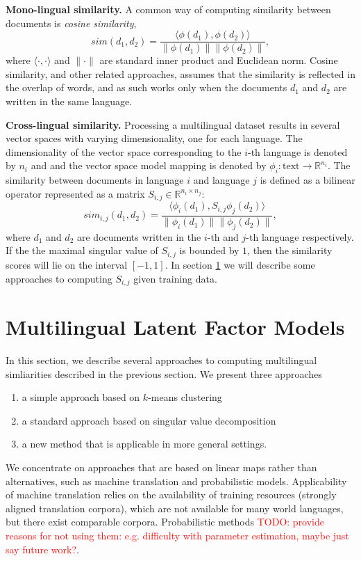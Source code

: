 \documentclass[twoside,11pt]{article}
\newcommand{\todo}[1]{\textcolor{red}{TODO: #1}}
\newcommand{\RR}{\mathbb{R}}
\begin{document}
\textbf {Mono-lingual similarity.}
A common way of computing similarity between documents is \emph{cosine similarity},
$$sim(d_1, d_2) = \frac{\langle \phi(d_1), \phi(d_2)\rangle}{\|\phi(d_1)\| \|\phi(d_2)\|},$$
where $\langle \cdot,\cdot \rangle$ and $\|\cdot\|$ are standard inner product and Euclidean norm. Cosine similarity, and other related approaches, assumes that the similarity is reflected in the overlap of words, and as such works only when the documents $d_1$ and $d_2$ are written in the same language.

\textbf {Cross-lingual similarity.}
Processing a multilingual dataset results in several vector spaces with varying dimensionality, one for each language. The dimensionality of the vector space corresponding to the $i$-th language is denoted by $n_i$ and and the vector space model mapping is denoted by $\phi_i : \text{text} \rightarrow \RR^{n_i}$.
The similarity between documents in language $i$ and language $j$ is defined as a bilinear operator represented as a matrix $S_{i,j} \in \RR^{n_i \times n_j}$:
$$sim_{i,j}(d_1, d_2) = \frac{ \langle \phi_i (d_1), S_{i,j} \phi_j (d_2) \rangle }{\|\phi_i(d_1)\| \|\phi_j(d_2)\|},$$
where $d_1$ and $d_2$ are documents written in the $i$-th and $j$-th language respectively. If the the maximal singular value of $S_{i,j}$ is bounded by $1$, then the similarity scores will lie on the interval $[-1, 1]$. In section \ref{sec:models} we will describe some approaches to computing $S_{i,j}$ given training data.

\section{Multilingual Latent Factor Models}\label{sec:models}
In this section, we describe several approaches to computing multilingual simliarities described in the previous section. We present three approaches
\begin{enumerate}
\item  a simple approach based on $k$-means clustering
\item  a standard approach based on singular value decomposition
\item a new method that is applicable in more general settings.
\end{enumerate}
 We concentrate on approaches that are based on linear maps rather than alternatives, such as machine translation and probabilistic models. Applicability of machine translation relies
on the availability of training resources (strongly aligned translation corpora), which are not available for many world languages, but there exist comparable corpora. Probabilistic
methods \todo{provide reasons for not using them: e.g. difficulty with parameter estimation, maybe just say future work?}.
\end{document}
